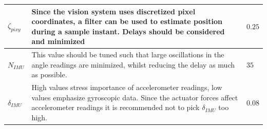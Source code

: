 \begin{table}[H]
\begin{tabular}{p{2.5cm} p{9cm} p{3cm}}
      $\zeta_{pixy}$    &  Since the vision system uses discretized pixel coordinates, a filter can be used to estimate position during a sample instant. Delays should be considered and minimized     & $0.25$   \\ \hline
      $N_{IMU}$    &  This value should be tuned such that large oscillations in the angle readings are minimized, whilst reducing the delay as much as possible. & $35$   \\ \hline
      $\delta_{IMU}$    &  High values stress importance of accelerometer readings, low values emphasize gyroscopic data. Since the actuator forces affect accelerometer readings it is recommended not to pick $\delta_{IMU}$ too high.  & $0.08$  \\ \hline
    \end{tabular}
    \label{tab5:tuningcosiderations}
\end{table}

